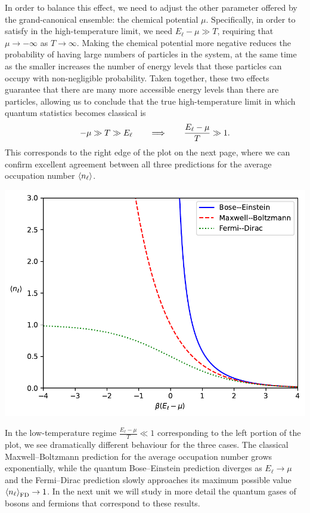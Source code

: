 In order to balance this effect, we need to adjust the other parameter offered by the grand-canonical ensemble: the chemical potential $\mu$.
Specifically, in order to satisfy  in the high-temperature limit, we need $E_{\ell} - \mu \gg T$, requiring that $\mu \to -\infty$ as $T \to \infty$.
Making the chemical potential more negative reduces the probability of having large numbers of particles in the system, at the same time as the smaller \be increases the number of energy levels that these particles can occupy with non-negligible probability.
Taken together, these two effects guarantee that there are many more accessible energy levels than there are particles, allowing us to conclude that the true high-temperature limit in which quantum statistics becomes classical is
\begin{equation}
  -\mu \gg T \gg E_{\ell} \qquad \Longrightarrow \qquad \frac{E_{\ell} - \mu}{T} \gg 1.
\end{equation}
This corresponds to the right edge of the plot on the next page, where we can confirm excellent agreement between all three predictions for the average occupation number $\left\langle n_{\ell} \right\rangle$.

\begin{center}\includegraphics[width=\textwidth]{figs/unit07_dist.pdf}\end{center}

In the low-temperature regime $\frac{E_{\ell} - \mu}{T} \ll 1$ corresponding to the left portion of the plot, we see dramatically different behaviour for the three cases.
The classical Maxwell--Boltzmann prediction for the average occupation number grows exponentially, while the quantum Bose--Einstein prediction diverges as $E_{\ell} \to \mu$ and the Fermi--Dirac prediction slowly approaches its maximum possible value $\left\langle n_{\ell} \right\rangle_{\text{FD}} \to 1$.
In the next unit we will study in more detail the quantum gases of bosons and fermions that correspond to these results.
